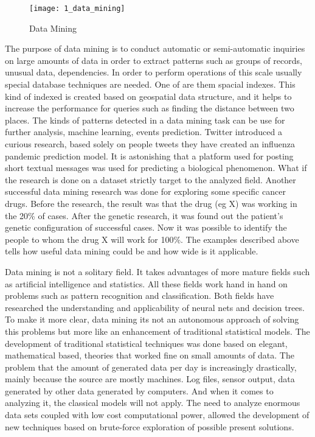 \begin{figure}[!ht]
\centering
\texttt{[image: 1\_data\_mining]}
\caption{Data Mining}\label{data_mining}
\end{figure}

The purpose of data mining is to conduct automatic or semi-automatic inquiries on large amounts of data in order to extract patterns such as groups of records, unusual data, dependencies. In order to perform operations of this scale usually special database techniques are needed. One of are them spacial indexes. This kind of indexed is created based on geospatial data structure, and it helps to increase the performance for queries such as finding the distance between two places. The kinds of patterns detected in a data mining task can be use for further analysis, machine learning, events prediction. Twitter introduced a curious research, based solely on people tweets they have created an influenza pandemic prediction model. It is astonishing that a platform used for posting short textual messages was used for predicting a biological phenomenon. What if the research is done on a dataset strictly target to the analyzed field. Another successful data mining research was done for exploring some specific cancer drugs. Before the research, the result was that the drug (eg X) was working in the 20\% of cases. After the genetic research, it was found out the patient's genetic configuration of successful cases. Now it was possible to identify the people to whom the drug X will work for 100\%. The examples described above tells how useful data mining could be and how wide is it applicable.

Data mining is not a solitary field. It takes advantages of more mature fields such as artificial intelligence and statistics. All these fields work hand in hand on problems such as pattern recognition and classification. Both fields have researched the understanding and applicability of neural nets and decision trees. To make it more clear, data mining its not an autonomous approach of solving this problems but more like an enhancement of traditional statistical models. The development of traditional statistical techniques was done based on elegant, mathematical based, theories that worked fine on small amounts of data. The problem that the amount of generated data per day is increasingly drastically, mainly because the source are mostly machines. Log files, sensor output, data generated by other data generated by computers. And when it comes to analyzing it, the classical models will not apply. The need to analyze enormous data sets coupled with low cost computational power, allowed the development of new techniques based on brute-force exploration of possible present solutions.

